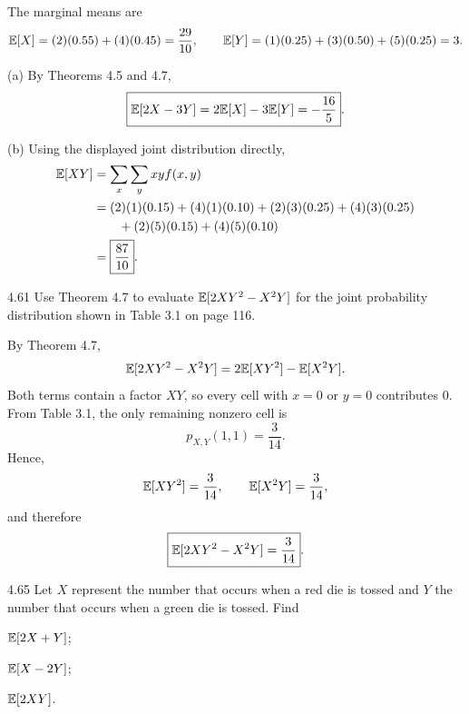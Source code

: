 \documentclass[11pt,oneside]{article}
\begin{document}
\begin{solution}
The marginal means are
\[
    \mathbb{E}[X]=(2)(0.55)+(4)(0.45)=\frac{29}{10},
    \qquad
    \mathbb{E}[Y]=(1)(0.25)+(3)(0.50)+(5)(0.25)=3.
\]

\noindent\textup{(a)} By Theorems 4.5 and 4.7,
\[
    \boxed{\mathbb{E}[2X-3Y]
    =2\mathbb{E}[X]-3\mathbb{E}[Y]
    =-\frac{16}{5}}.
\]

\medskip
\noindent\textup{(b)} Using the displayed joint distribution directly,
\[
\begin{aligned}
    \mathbb{E}[XY]
    &=\sum_x\sum_y xyf(x,y)\\
    &=(2)(1)(0.15)+(4)(1)(0.10)
      +(2)(3)(0.25)+(4)(3)(0.25)\\
    &\qquad +(2)(5)(0.15)+(4)(5)(0.10)\\
    &=\boxed{\frac{87}{10}}.
\end{aligned}
\]

\end{solution}

\begin{exercise}{4.61}
Use Theorem 4.7 to evaluate $\mathbb{E}[2XY^2-X^2Y]$ for the joint probability distribution shown in Table 3.1 on page 116.
\end{exercise}

\begin{solution}
By Theorem 4.7,
\[
    \mathbb{E}[2XY^2-X^2Y]
    =2\mathbb{E}[XY^2]-\mathbb{E}[X^2Y].
\]
Both terms contain a factor $XY$, so every cell with $x=0$ or $y=0$ contributes $0$. From Table 3.1, the only remaining nonzero cell is
\[
    p_{X,Y}(1,1)=\frac3{14}.
\]
Hence,
\[
    \mathbb{E}[XY^2]=\frac3{14},
    \qquad
    \mathbb{E}[X^2Y]=\frac3{14},
\]
and therefore
\[
    \boxed{\mathbb{E}[2XY^2-X^2Y]=\frac3{14}}.
\]
\end{solution}

\begin{exercise}{4.65}
Let $X$ represent the number that occurs when a red die is tossed and $Y$ the number that occurs when a green die is tossed. Find
\begin{exercisesubparts}
    \item $\mathbb{E}[2X+Y]$;
    \item $\mathbb{E}[X-2Y]$;
    \item $\mathbb{E}[2XY]$.
\end{exercisesubparts}
\end{exercise}
\end{document}
